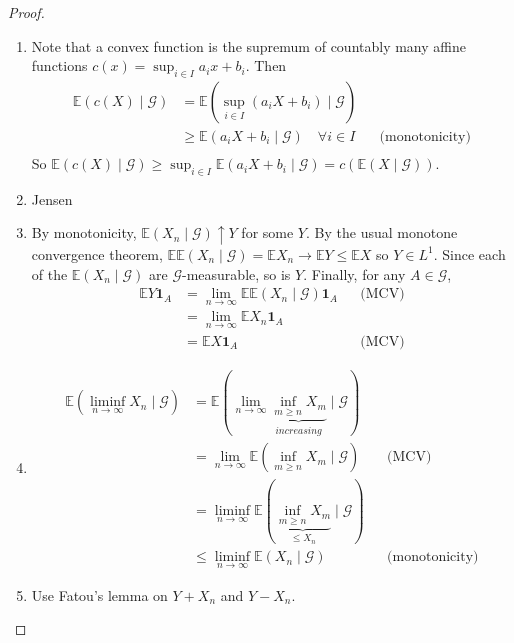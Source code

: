 \documentclass[parskip=full]{article}
\theoremstyle{definition}
\newcommand{\1}{\mathbbm{1}}
\newcommand{\E}{\mathbb{E}}
\begin{document}
\begin{proof}
  \begin{enumerate}
    \item Note that a convex function is the supremum of countably many affine functions $c(x) = \sup_{i \in I} a_i x + b_i$. Then
          \begin{align*}
            \E(c(X) \mid \mathcal{G}) &= \E \left(\sup_{i \in I}\left( a_i X + b_i \right)\mid \mathcal{G} \right)\\
              & \geq \E(a_i X + b_i \mid \mathcal{G}) \quad \forall i \in I &   & \text{(monotonicity)} \\
          \end{align*}
          So $\E(c(X) \mid \mathcal{G}) \geq \sup_{i \in I} \E(a_i X + b_i \mid \mathcal{G}) = c(\E(X \mid \mathcal{G}))$.
    \item Jensen
    \item By monotonicity, $\E(X_n \mid \mathcal{G}) \uparrow Y$ for some $Y$. By the usual monotone convergence theorem, $\E \E (X_n \mid \mathcal{G}) = \E X_n \to \E Y \leq \E X$ so $Y \in L^1$. Since each of the $\E (X_n \mid \mathcal{G})$ are $\mathcal{G}$-measurable, so is $Y$. Finally, for any $A \in \mathcal{G}$,
          \begin{align*}
            \E Y \mathbf{1}_A & = \lim_{n \to \infty} \E \E(X_n \mid \mathcal{G}) \mathbf{1}_A &   & \text{(MCV)} \\
            &= \lim_{n \to \infty} \E X_n \mathbf{1}_A\\
                              & = \E X \mathbf{1}_A                                            &   & \text{(MCV)}
          \end{align*}
    \item \begin{align*}
            \E \left (\liminf_{n \to \infty} X_n \mid \mathcal{G} \right) &= \E \left (\lim_{n \to \infty} \underbrace{\inf_{m \geq n} X_m}_{increasing} \mid \mathcal{G} \right)\\
              & = \lim_{n \to \infty} \E \left (\inf_{m \geq n} X_m \mid \mathcal{G} \right) &   & \text{(MCV)}          \\
            &= \liminf_{n \to \infty} \E \left (\underbrace{\inf_{m \geq n} X_m}_{\leq X_n} \mid \mathcal{G}\right)\\
              & \leq \liminf_{n \to \infty}\E(X_n \mid \mathcal{G})                          &   & \text{(monotonicity)}
          \end{align*}
    \item Use Fatou's lemma on $Y + X_n$ and $Y - X_n$.
  \end{enumerate}
\end{proof}
\end{document}

